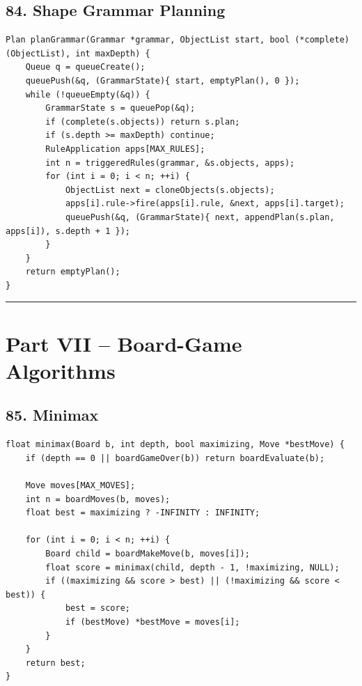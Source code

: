 \documentclass[10pt,letterpaper]{article}
\begin{document}
\subsection*{84. Shape Grammar Planning}
{}

\begin{verbatim}
Plan planGrammar(Grammar *grammar, ObjectList start, bool (*complete)(ObjectList), int maxDepth) {
    Queue q = queueCreate();
    queuePush(&q, (GrammarState){ start, emptyPlan(), 0 });
    while (!queueEmpty(&q)) {
        GrammarState s = queuePop(&q);
        if (complete(s.objects)) return s.plan;
        if (s.depth >= maxDepth) continue;
        RuleApplication apps[MAX_RULES];
        int n = triggeredRules(grammar, &s.objects, apps);
        for (int i = 0; i < n; ++i) {
            ObjectList next = cloneObjects(s.objects);
            apps[i].rule->fire(apps[i].rule, &next, apps[i].target);
            queuePush(&q, (GrammarState){ next, appendPlan(s.plan, apps[i]), s.depth + 1 });
        }
    }
    return emptyPlan();
}
\end{verbatim}

\medskip\hrule\medskip

\clearpage
\section*{Part VII -- Board-Game Algorithms}

\subsection*{85. Minimax}
{}

\begin{verbatim}
float minimax(Board b, int depth, bool maximizing, Move *bestMove) {
    if (depth == 0 || boardGameOver(b)) return boardEvaluate(b);

    Move moves[MAX_MOVES];
    int n = boardMoves(b, moves);
    float best = maximizing ? -INFINITY : INFINITY;

    for (int i = 0; i < n; ++i) {
        Board child = boardMakeMove(b, moves[i]);
        float score = minimax(child, depth - 1, !maximizing, NULL);
        if ((maximizing && score > best) || (!maximizing && score < best)) {
            best = score;
            if (bestMove) *bestMove = moves[i];
        }
    }
    return best;
}
\end{verbatim}
\end{document}
